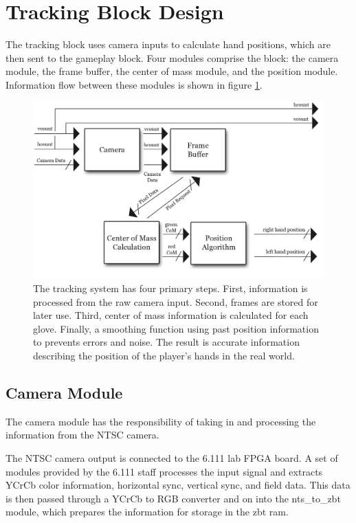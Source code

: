 \section{Tracking Block Design}
\label{sec:tracking}

The tracking block uses camera inputs to calculate hand positions, which are
then sent to the gameplay block. Four modules 
comprise the block: the camera module, the frame buffer, the center of mass
module, and the position module. Information flow between these modules is shown
in figure \ref{fig:tracking}.

\begin{figure}
\centering
\includegraphics[scale=1]{img/tracking.png}
\caption{The tracking system has four primary steps. First, information is
processed from the raw camera input. Second, frames are stored for later use.
Third, center of mass information is calculated for each glove. Finally, a
smoothing function using past position information to prevents errors and noise.
The result is accurate information describing the position of the player's
hands in the real world.}
\label{fig:tracking}
\end{figure}

\subsection{Camera Module}

The camera module has the responsibility of taking in and processing the
information from the NTSC camera.

The NTSC camera output is connected to the 6.111 lab FPGA board. A set of
modules provided by the 6.111 staff processes the input signal and extracts
YCrCb color information, horizontal sync, vertical sync, and field data. This
data is then passed through a YCrCb to RGB converter and on into the
nts\_to\_zbt module, which prepares the information for
storage in the zbt ram.

